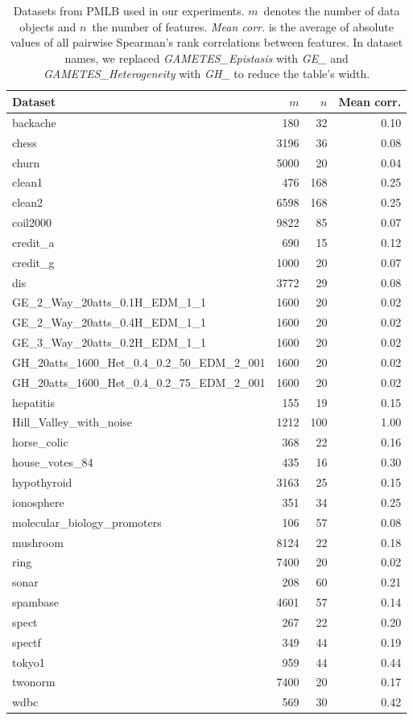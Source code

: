 \documentclass{article}
\theoremstyle{definition}
\begin{document}
\begin{table}[p]
	\centering
	\begin{tabular}{lrrr}
		\toprule
		Dataset & $m$ & $n$ & Mean corr. \\
		\midrule
		backache & 180 & 32 & 0.10 \\
		chess & 3196 & 36 & 0.08 \\
		churn & 5000 & 20 & 0.04 \\
		clean1 & 476 & 168 & 0.25 \\
		clean2 & 6598 & 168 & 0.25 \\
		coil2000 & 9822 & 85 & 0.07 \\
		credit\_a & 690 & 15 & 0.12 \\
		credit\_g & 1000 & 20 & 0.07 \\
		dis & 3772 & 29 & 0.08 \\
		GE\_2\_Way\_20atts\_0.1H\_EDM\_1\_1 & 1600 & 20 & 0.02 \\
		GE\_2\_Way\_20atts\_0.4H\_EDM\_1\_1 & 1600 & 20 & 0.02 \\
		GE\_3\_Way\_20atts\_0.2H\_EDM\_1\_1 & 1600 & 20 & 0.02 \\
		GH\_20atts\_1600\_Het\_0.4\_0.2\_50\_EDM\_2\_001 & 1600 & 20 & 0.02 \\
		GH\_20atts\_1600\_Het\_0.4\_0.2\_75\_EDM\_2\_001 & 1600 & 20 & 0.02 \\
		hepatitis & 155 & 19 & 0.15 \\
		Hill\_Valley\_with\_noise & 1212 & 100 & 1.00 \\
		horse\_colic & 368 & 22 & 0.16 \\
		house\_votes\_84 & 435 & 16 & 0.30 \\
		hypothyroid & 3163 & 25 & 0.15 \\
		ionosphere & 351 & 34 & 0.25 \\
		molecular\_biology\_promoters & 106 & 57 & 0.08 \\
		mushroom & 8124 & 22 & 0.18 \\
		ring & 7400 & 20 & 0.02 \\
		sonar & 208 & 60 & 0.21 \\
		spambase & 4601 & 57 & 0.14 \\
		spect & 267 & 22 & 0.20 \\
		spectf & 349 & 44 & 0.19 \\
		tokyo1 & 959 & 44 & 0.44 \\
		twonorm & 7400 & 20 & 0.17 \\
		wdbc & 569 & 30 & 0.42 \\
		\bottomrule
	\end{tabular}
	\caption{
		Datasets from PMLB used in our experiments.
		$m$~denotes the number of data objects and $n$~the number of features.
		\emph{Mean corr.} is the average of absolute values of all pairwise Spearman's rank correlations between features.
		In dataset names, we replaced \emph{GAMETES\_Epistasis} with \emph{GE\_} and \emph{GAMETES\_Heterogeneity} with \emph{GH\_} to reduce the table's width.
	}
	\label{tab:afs:datasets}
\end{table}
\end{document}
